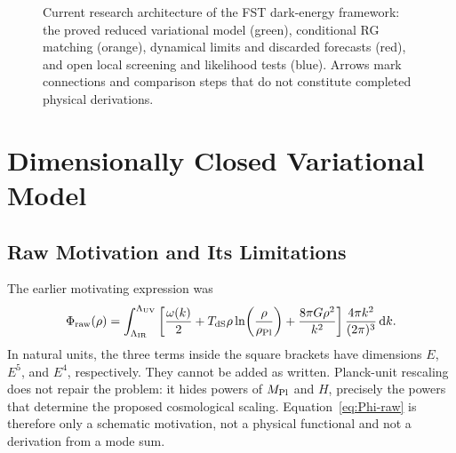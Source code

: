 \documentclass[12pt,a4paper]{article}
\theoremstyle{definition}
\theoremstyle{plain}
\theoremstyle{remark}
\newcommand{\LUV}{\Lambda_{\mathrm{UV}}}
\newcommand{\LIR}{\Lambda_{\mathrm{IR}}}
\newcommand{\dd}{\mathrm{d}}
\begin{document}
\begin{figure}[htbp]
{%
}
\caption{Current research architecture of the FST dark-energy framework: the proved reduced variational model (green), conditional RG matching (orange), dynamical limits and discarded forecasts (red), and open local screening and likelihood tests (blue). Arrows mark connections and comparison steps that do not constitute completed physical derivations.}
\label{fig:epistemic_architecture}\label{fig:epistemische_architektur}
\end{figure}

\section{Dimensionally Closed Variational Model}\label{sec:functional}

\subsection{Raw Motivation and Its Limitations}

The earlier motivating expression was
\begin{equation}\label{eq:Phi-raw}
 \Phi_{\rm raw}(\rho)=
 \int_{\LIR}^{\LUV}
 \left[
 \frac{\omega(k)}{2}
 +T_{\rm dS}\rho\ln\!\left(\frac{\rho}{\rho_{\rm Pl}}\right)
 +\frac{8\pi G\rho^2}{k^2}
 \right]\frac{4\pi k^2}{(2\pi)^3}\,\dd k .
\end{equation}
In natural units, the three terms inside the square brackets have dimensions
\(E\), \(E^5\), and \(E^4\), respectively.  They cannot be added as written.
Planck-unit rescaling does not repair the problem: it hides powers of
\(M_{\rm Pl}\) and \(H\), precisely the powers that determine the proposed
cosmological scaling.  Equation~\eqref{eq:Phi-raw} is therefore only a
schematic motivation, not a physical functional and not a derivation from a
mode sum.
\end{document}
